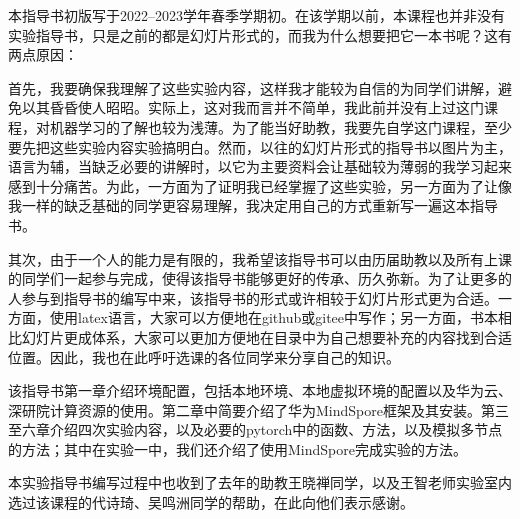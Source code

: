 


\hspace{2em}本指导书初版写于2022--2023学年春季学期初。在该学期以前，本课程也并非没有实验指导书，只是之前的都是幻灯片形式的，而我为什么想要把它一本书呢？这有两点原因：

\hspace{2em}首先，我要确保我理解了这些实验内容，这样我才能较为自信的为同学们讲解，避免以其昏昏使人昭昭。实际上，这对我而言并不简单，我此前并没有上过这门课程，对机器学习的了解也较为浅薄。为了能当好助教，我要先自学这门课程，至少要先把这些实验内容实验搞明白。然而，以往的幻灯片形式的指导书以图片为主，语言为辅，当缺乏必要的讲解时，以它为主要资料会让基础较为薄弱的我学习起来感到十分痛苦。为此，一方面为了证明我已经掌握了这些实验，另一方面为了让像我一样的缺乏基础的同学更容易理解，我决定用自己的方式重新写一遍这本指导书。

\hspace{2em}其次，由于一个人的能力是有限的，我希望该指导书可以由历届助教以及所有上课的同学们一起参与完成，使得该指导书能够更好的传承、历久弥新。为了让更多的人参与到指导书的编写中来，该指导书的形式或许相较于幻灯片形式更为合适。一方面，使用latex语言，大家可以方便地在github或gitee中写作；另一方面，书本相比幻灯片更成体系，大家可以更加方便地在目录中为自己想要补充的内容找到合适位置。因此，我也在此呼吁选课的各位同学来分享自己的知识。


\hspace{2em}该指导书第一章介绍环境配置，包括本地环境、本地虚拟环境的配置以及华为云、深研院计算资源的使用。第二章中简要介绍了华为MindSpore框架及其安装。第三至六章介绍四次实验内容，以及必要的pytorch中的函数、方法，以及模拟多节点的方法；其中在实验一中，我们还介绍了使用MindSpore完成实验的方法。

\hspace{2em}本实验指导书编写过程中也收到了去年的助教王晓禅同学，以及王智老师实验室内选过该课程的代诗琦、吴鸣洲同学的帮助，在此向他们表示感谢。

